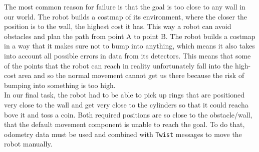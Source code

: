 \documentclass[12pt,a4paper]{article}
\begin{document}
	The most common reason for failure is that the goal is too close to any wall in our world. The robot builds a costmap of its environment, where the closer the position is to the wall, the highest cost it has. This way a robot can avoid obstacles and plan the path from point A to point B. The robot builds a costmap in a way that it makes sure not to bump into anything, which means it also takes into account all possible errors in data from its detectors. This means that some of the points that the robot can reach in reality unfortunately fall into the high-cost area and so the normal movement cannot get us there because the risk of bumping into something is too high. \\

	In our final task, the robot had to be able to pick up rings that are positioned very close to the wall and get very close to the cylinders so that it could reacha bove it and toss a coin. Both required positions are so close to the obstacle/wall, that the default movement component is unable to reach the goal. To do that, odometry data must be used and combined with \texttt{Twist} messages to move the robot manually. \\
	
\end{document}
